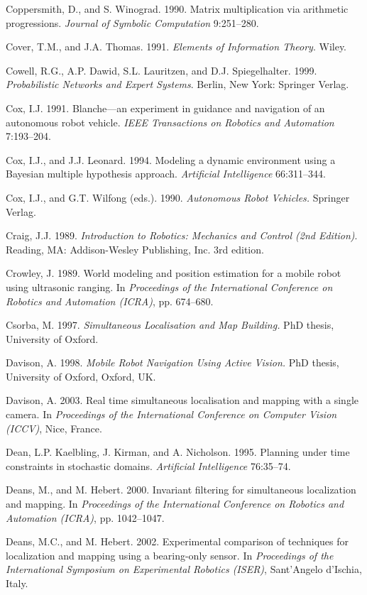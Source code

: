 \documentclass[10pt,a4paper]{article}
\begin{document}
Coppersmith, D., and S. Winograd. 1990. Matrix multiplication via arithmetic progressions.
\textit{Journal of Symbolic Computation} 9:251–280.

Cover, T.M., and J.A. Thomas. 1991. \textit{Elements of Information Theory}. Wiley.

Cowell, R.G., A.P. Dawid, S.L. Lauritzen, and D.J. Spiegelhalter. 1999. \textit{Probabilistic
Networks and Expert Systems}. Berlin, New York: Springer Verlag.

Cox, I.J. 1991. Blanche—an experiment in guidance and navigation of an autonomous
robot vehicle. \textit{IEEE Transactions on Robotics and Automation} 7:193–204.

Cox, I.J., and J.J. Leonard. 1994. Modeling a dynamic environment using a Bayesian
multiple hypothesis approach. \textit{Artificial Intelligence} 66:311–344.

Cox, I.J., and G.T. Wilfong (eds.). 1990. \textit{Autonomous Robot Vehicles.} Springer Verlag.

Craig, J.J. 1989. \textit{Introduction to Robotics: Mechanics and Control (2nd Edition)}. Reading,
MA: Addison-Wesley Publishing, Inc. 3rd edition.

Crowley, J. 1989. World modeling and position estimation for a mobile robot using
ultrasonic ranging. In \textit{Proceedings of the International Conference on Robotics and
Automation (ICRA)}, pp. 674–680.

Csorba, M. 1997. \textit{Simultaneous Localisation and Map Building.} PhD thesis, University
of Oxford.

Davison, A. 1998. \textit{Mobile Robot Navigation Using Active Vision.} PhD thesis, University
of Oxford, Oxford, UK.

Davison, A. 2003. Real time simultaneous localisation and mapping with a single
camera. In \textit{Proceedings of the International Conference on Computer Vision (ICCV)},
Nice, France.

Dean, L.P. Kaelbling, J. Kirman, and A. Nicholson. 1995. Planning under time constraints
in stochastic domains. \textit{Artificial Intelligence} 76:35–74.

Deans, M., and M. Hebert. 2000. Invariant filtering for simultaneous localization and
mapping. In \textit{Proceedings of the International Conference on Robotics and Automation
(ICRA)}, pp. 1042–1047.

Deans, M.C., and M. Hebert. 2002. Experimental comparison of techniques for localization
and mapping using a bearing-only sensor. In \textit{Proceedings of the International
Symposium on Experimental Robotics (ISER)}, Sant’Angelo d’Ischia, Italy.
\end{document}
